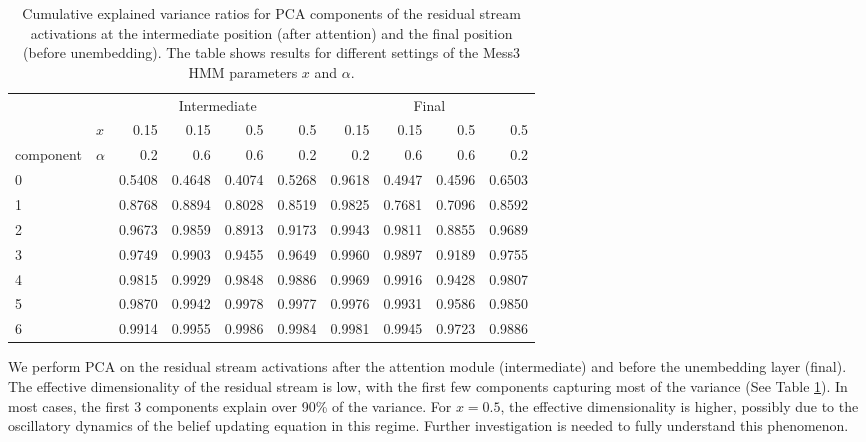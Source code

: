 \documentclass{article}
\theoremstyle{plain}
\theoremstyle{definition}
\theoremstyle{remark}
\begin{document}
\begin{table}[htbp]
\centering
  \caption{Cumulative explained variance ratios for PCA components of the residual stream activations at the intermediate position (after attention) and the final position (before unembedding). 
  The table shows results for different settings of the Mess3 HMM parameters $x$ and $\alpha$.}
\label{tab:pca-combined}
  {
  \begin{tabular}{llrrrrrrrr}
    \toprule
    & & \multicolumn{4}{c}{Intermediate} & \multicolumn{4}{c}{Final} \\
    \cmidrule(lr){3-6} \cmidrule(lr){7-10}
     & $x$ & 0.15 & 0.15 & 0.5 & 0.5 & 0.15 & 0.15 & 0.5 & 0.5 \\
    component & $\alpha$ & 0.2 & 0.6 & 0.6 & 0.2 & 0.2 & 0.6 & 0.6 & 0.2 \\
    \midrule
    0 & & 0.5408 & 0.4648 & 0.4074 & 0.5268 & 0.9618 & 0.4947 & 0.4596 & 0.6503 \\
    1 & & 0.8768 & 0.8894 & 0.8028 & 0.8519 & 0.9825 & 0.7681 & 0.7096 & 0.8592 \\
    2 & & 0.9673 & 0.9859 & 0.8913 & 0.9173 & 0.9943 & 0.9811 & 0.8855 & 0.9689 \\
    3 & & 0.9749 & 0.9903 & 0.9455 & 0.9649 & 0.9960 & 0.9897 & 0.9189 & 0.9755 \\
    4 & & 0.9815 & 0.9929 & 0.9848 & 0.9886 & 0.9969 & 0.9916 & 0.9428 & 0.9807 \\
    5 & & 0.9870 & 0.9942 & 0.9978 & 0.9977 & 0.9976 & 0.9931 & 0.9586 & 0.9850 \\
    6 & & 0.9914 & 0.9955 & 0.9986 & 0.9984 & 0.9981 & 0.9945 & 0.9723 & 0.9886 \\
    \bottomrule
    \end{tabular}
  }

\end{table}

We perform PCA on the residual stream activations after the attention module (intermediate) and before the unembedding layer (final).
The effective dimensionality of the residual stream is low, with the first few components capturing most of the variance (See Table \ref{tab:pca-combined}).
In most cases, the first 3 components explain over 90\% of the variance.
For $x=0.5$, the effective dimensionality is higher, possibly due to the oscillatory dynamics of the belief updating equation in this regime.
Further investigation is needed to fully understand this phenomenon.






\end{document}
